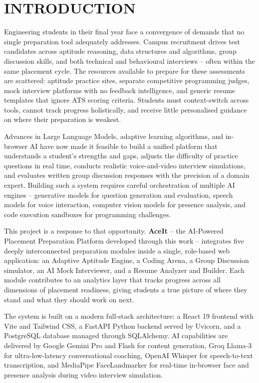 \documentclass[12pt,a4paper]{report}
\begin{document}
\chapter{INTRODUCTION}

Engineering students in their final year face a convergence of demands that no single preparation tool adequately addresses. Campus recruitment drives test candidates across aptitude reasoning, data structures and algorithms, group discussion skills, and both technical and behavioural interviews -- often within the same placement cycle. The resources available to prepare for these assessments are scattered: aptitude practice sites, separate competitive programming judges, mock interview platforms with no feedback intelligence, and generic resume templates that ignore ATS scoring criteria. Students must context-switch across tools, cannot track progress holistically, and receive little personalised guidance on where their preparation is weakest.

Advances in Large Language Models, adaptive learning algorithms, and in-browser AI have now made it feasible to build a unified platform that understands a student's strengths and gaps, adjusts the difficulty of practice questions in real time, conducts realistic voice-and-video interview simulations, and evaluates written group discussion responses with the precision of a domain expert. Building such a system requires careful orchestration of multiple AI engines -- generative models for question generation and evaluation, speech models for voice interaction, computer vision models for presence analysis, and code execution sandboxes for programming challenges.

This project is a response to that opportunity. \textbf{AceIt} -- the AI-Powered Placement Preparation Platform developed through this work -- integrates five deeply interconnected preparation modules inside a single, role-based web application: an Adaptive Aptitude Engine, a Coding Arena, a Group Discussion simulator, an AI Mock Interviewer, and a Resume Analyzer and Builder. Each module contributes to an analytics layer that tracks progress across all dimensions of placement readiness, giving students a true picture of where they stand and what they should work on next.

The system is built on a modern full-stack architecture: a React 19 frontend with Vite and Tailwind CSS, a FastAPI Python backend served by Uvicorn, and a PostgreSQL database managed through SQLAlchemy. AI capabilities are delivered by Google Gemini Pro and Flash for content generation, Groq Llama-3 for ultra-low-latency conversational coaching, OpenAI Whisper for speech-to-text transcription, and MediaPipe FaceLandmarker for real-time in-browser face and presence analysis during video interview simulation.
\end{document}
